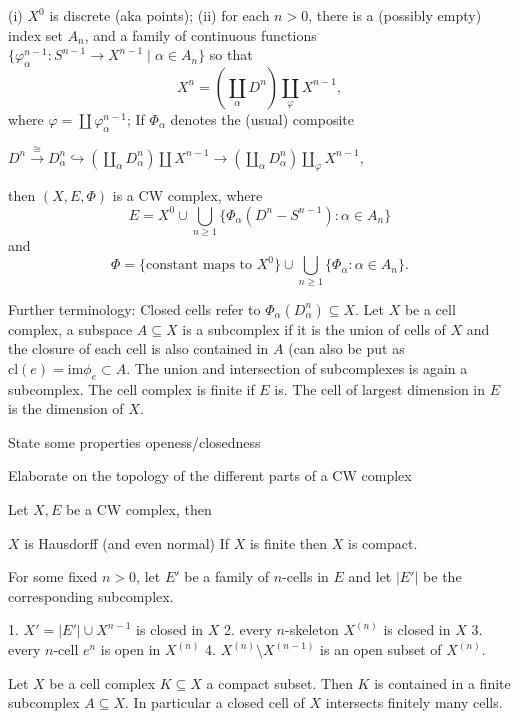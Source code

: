 (i) \( X^0 \) is discrete (aka points); 
(ii) for each \(n > 0\), there is a (possibly empty) index set \(A_n\), and a family of continuous functions 
\(\{\varphi_{\alpha}^{n-1} : S^{n-1} \to X^{n-1} \mid \alpha \in A_n\}\) so that
\[
X^n = \left( \coprod_{\alpha} D^n \right) \coprod_{\varphi} X^{n-1}, 
\]
where \(\varphi = \coprod \varphi_{\alpha}^{n-1}\);
If \(\Phi_\alpha\) denotes the (usual) composite

\( D^n \xrightarrow{\cong} D^n_\alpha \hookrightarrow \left( \coprod_\alpha D^n_\alpha \right) \coprod X^{n-1} \xrightarrow{} \left( \coprod_\alpha D^n_\alpha \right) \coprod_\varphi X^{n-1}, \)

then \((X, E, \Phi)\) is a CW complex, where
\[ E = X^0 \cup \bigcup_{n \geq 1} \{ \Phi_\alpha (D^n - S^{n-1}) : \alpha \in A_n \} \]
and
\[ \Phi = \{ \text{constant maps to } X^0 \} \cup \bigcup_{n \geq 1} \{ \Phi_\alpha : \alpha \in A_n \}. \]

Further terminology:
Closed cells refer to \( \Phi_\alpha(D^n_\alpha) \subseteq X \).
Let \( X \) be a cell complex, a subspace \( A \subseteq X \) is a subcomplex if it is the union of cells of \( X \) and 
the closure of each cell is also contained in \( A \) (can also be put as \( \text{cl}(e) = \text{im} \phi_e \subset A \).
The union and intersection of subcomplexes is again a subcomplex.
The cell complex is finite if \( E \) is. The cell of largest dimension in \( E \) is the dimension of \( X \).

State some properties openess/closedness 

Elaborate on the topology of the different parts of a CW complex

Let \( X, E \) be a CW complex, then

\( X \) is Hausdorff (and even normal)
If \( X \) is finite then \( X \) is compact.

For some fixed \( n > 0 \), let \( E' \) be a family of \( n \)-cells in \( E \)
and let \( |E'| \) be the corresponding subcomplex.

1. \( X' = |E'| \cup X^{n-1} \) is closed in \( X \)
2. every \( n \)-skeleton \( X^{(n)} \) is closed in \( X \)
3. every \( n \)-cell \( e^n \) is open in \( X^{(n)} \)
4. \( X^{(n)} \setminus X^{(n-1)} \) is an open subset of \( X^{(n)} \).

Let \( X \) be a cell complex \( K \subseteq X \) a compact subset. 
Then \( K \) is contained in a finite subcomplex \( A \subseteq X \).
In particular a closed cell of \( X \) intersects finitely many cells.

